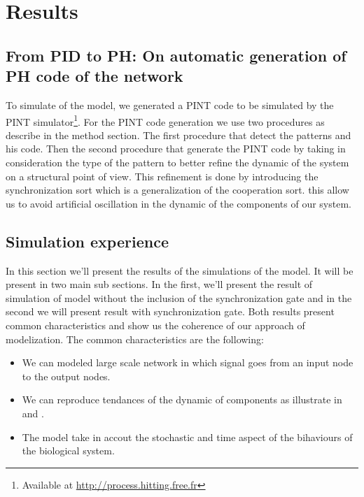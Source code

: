 
\section{Results}

\subsection{From PID to PH: On automatic generation of PH code of the network}

To simulate of the model, we generated a PINT code to be simulated by the PINT simulator\footnote{Available at \url{http://process.hitting.free.fr}}. 
For the PINT code generation we use two procedures as describe in the method section. The first procedure that detect the patterns and his code. Then the second 
procedure that generate the PINT code by taking in consideration the type of the pattern to better refine the dynamic of the system on a structural point of view.
This refinement is done by introducing the synchronization sort  which is a generalization of the cooperation sort. this allow us to avoid artificial oscillation
in the dynamic of the components of our system.


\subsection{Simulation experience}
In this section we'll present the results of the simulations of the model. It will be present in two 
main sub sections. In the first, we'll present the result of simulation of model without the inclusion 
of the synchronization gate and in the second we will present result with synchronization gate. Both results
present common characteristics and show us the coherence of our approach of modelization. The common characteristics
are the following:
\begin{itemize}
 \item We can modeled large scale network in which signal goes from an input node to the output nodes.
 \item We can reproduce tendances of the dynamic of components as illustrate in  and .
 \item The model take in accout the stochastic and time aspect of the bihaviours of the biological system.
\end{itemize}



